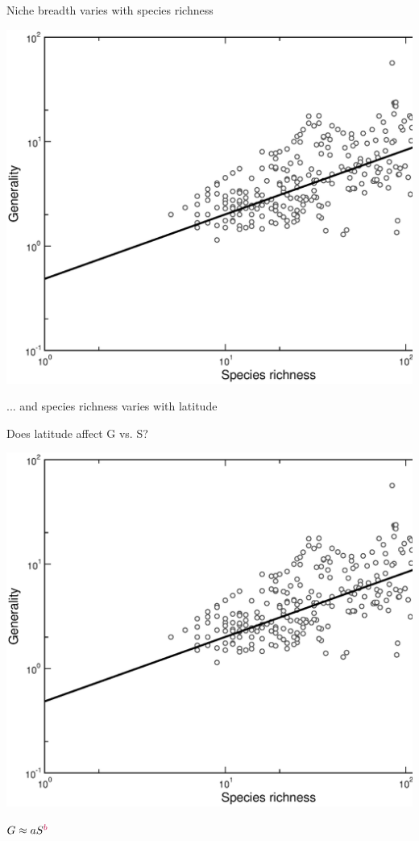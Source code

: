 \documentclass{beamer}
\begin{document}
  \begin{frame}{Niche breadth varies with species richness}

    \begin{center}
      \includegraphics*[width=.8\textwidth]{Figures/results/Gen_vs_S_fitline_observed.eps}

      \vspace{.5cm}
    ... and species richness varies with latitude
    \end{center}

  \end{frame}


  \begin{frame}{Does latitude affect G vs. S?}
    \begin{center}
      \includegraphics*[width=.8\textwidth]{Figures/results/Gen_vs_S_fitline_observed.eps}

      \vspace{.5cm}
    \end{center}
    \hspace{1in}
      $G \approx aS^{\color{purple}b}$

  \end{frame}
\end{document}
